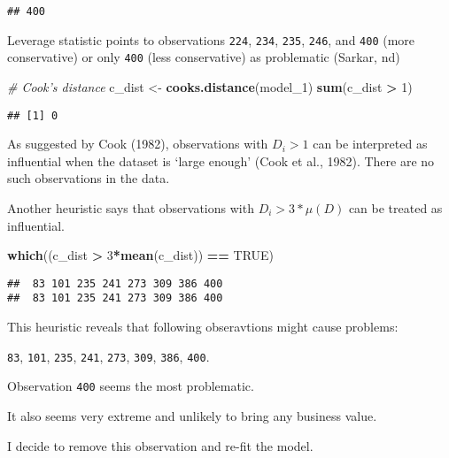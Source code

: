 \documentclass[]{article}
\newenvironment{Shaded}{\begin{snugshade}}{\end{snugshade}}
\newcommand{\CommentTok}[1]{\textcolor[rgb]{0.56,0.35,0.01}{\textit{#1}}}
\newcommand{\DecValTok}[1]{\textcolor[rgb]{0.00,0.00,0.81}{#1}}
\newcommand{\KeywordTok}[1]{\textcolor[rgb]{0.13,0.29,0.53}{\textbf{#1}}}
\newcommand{\NormalTok}[1]{#1}
\newcommand{\OperatorTok}[1]{\textcolor[rgb]{0.81,0.36,0.00}{\textbf{#1}}}
\newcommand{\OtherTok}[1]{\textcolor[rgb]{0.56,0.35,0.01}{#1}}
\newcommand{\StringTok}[1]{\textcolor[rgb]{0.31,0.60,0.02}{#1}}
\begin{document}
\begin{verbatim}
## 400
\end{verbatim}

Leverage statistic points to observations \texttt{224}, \texttt{234},
\texttt{235}, \texttt{246}, and \texttt{400} (more conservative) or only
\texttt{400} (less conservative) as problematic (Sarkar, nd)

\begin{Shaded}
\begin{Highlighting}[]
\CommentTok{# Cook's distance}
\NormalTok{c_dist <-}\StringTok{ }\KeywordTok{cooks.distance}\NormalTok{(model_}\DecValTok{1}\NormalTok{)}
\KeywordTok{sum}\NormalTok{(c_dist }\OperatorTok{>}\StringTok{ }\DecValTok{1}\NormalTok{)}
\end{Highlighting}
\end{Shaded}

\begin{verbatim}
## [1] 0
\end{verbatim}

As suggested by Cook (1982), observations with \(D_i > 1\) can be
interpreted as influential when the dataset is `large enough' (Cook et
al., 1982). There are no such observations in the data.

Another heuristic says that observations with \(D_i > 3 * \mu(D)\) can
be treated as influential.

\begin{Shaded}
\begin{Highlighting}[]
\KeywordTok{which}\NormalTok{((c_dist }\OperatorTok{>}\StringTok{ }\DecValTok{3}\OperatorTok{*}\KeywordTok{mean}\NormalTok{(c_dist)) }\OperatorTok{==}\StringTok{ }\OtherTok{TRUE}\NormalTok{)}
\end{Highlighting}
\end{Shaded}

\begin{verbatim}
##  83 101 235 241 273 309 386 400 
##  83 101 235 241 273 309 386 400
\end{verbatim}

This heuristic reveals that following obseravtions might cause problems:

\texttt{83}, \texttt{101}, \texttt{235}, \texttt{241}, \texttt{273},
\texttt{309}, \texttt{386}, \texttt{400}.

Observation \texttt{400} seems the most problematic.

It also seems very extreme and unlikely to bring any business value.

I decide to remove this observation and re-fit the model.
\end{document}

